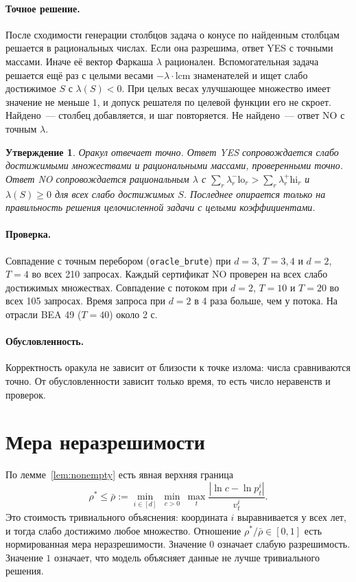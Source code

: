 \documentclass[a4paper,11pt]{article}
\theoremstyle{plain}
\newtheorem{proposition}[theorem]{Утверждение}
\theoremstyle{definition}
\theoremstyle{remark}
\newcommand{\abs}[1]{\left\lvert #1 \right\rvert}
\begin{document}
\paragraph{Точное решение.} После сходимости генерации столбцов задача о конусе по найденным столбцам решается в рациональных числах. Если она разрешима, ответ YES с точными массами. Иначе её вектор Фаркаша $\lambda$ рационален. Вспомогательная задача решается ещё раз с целыми весами $-\lambda\cdot\mathrm{lcm}$ знаменателей и ищет слабо достижимое $S$ с $\lambda(S)<0$. При целых весах улучшающее множество имеет значение не меньше $1$, и допуск решателя по целевой функции его не скроет. Найдено~--- столбец добавляется, и шаг повторяется. Не найдено~--- ответ NO с точным $\lambda$.

\begin{proposition}
    Оракул отвечает точно. Ответ YES сопровождается слабо достижимыми множествами и рациональными массами, проверенными точно. Ответ NO сопровождается рациональным $\lambda$ с $\sum_r\lambda_r^-\mathrm{lo}_r>\sum_r\lambda_r^+\mathrm{hi}_r$ и $\lambda(S)\ge0$ для всех слабо достижимых $S$. Последнее опирается только на правильность решения целочисленной задачи с целыми коэффициентами.
\end{proposition}

\paragraph{Проверка.} Совпадение с точным перебором (\texttt{oracle\_brute}) при $d=3$, $T=3,4$ и $d=2$, $T=4$ во всех 210 запросах. Каждый сертификат NO проверен на всех слабо достижимых множествах. Совпадение с потоком при $d=2$, $T=10$ и $T=20$ во всех 105 запросах. Время запроса при $d=2$ в 4 раза больше, чем у потока. На отрасли BEA 49 ($T=40$) около 2 с.

\paragraph{Обусловленность.} Корректность оракула не зависит от близости к точке излома: числа сравниваются точно. От обусловленности зависит только время, то есть число неравенств и проверок.

\section{Мера неразрешимости}

По лемме~\ref{lem:nonempty} есть явная верхняя граница
\[
    \rho^*\le\bar\rho:=\min_{i\in[d]}\ \min_{c>0}\ \max_t\frac{\abs{\ln c-\ln p^i_t}}{v^i_t}.
\]
Это стоимость тривиального объяснения: координата $i$ выравнивается у всех лет, и тогда слабо достижимо любое множество. Отношение $\rho^*/\bar\rho\in[0,1]$ есть нормированная мера неразрешимости. Значение $0$ означает слабую разрешимость. Значение $1$ означает, что модель объясняет данные не лучше тривиального решения.
\end{document}
